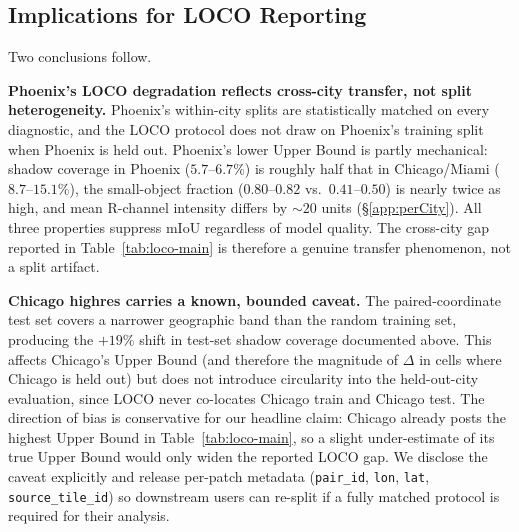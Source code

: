 \subsection{Implications for LOCO Reporting}
\label{app:splits-implications}

Two conclusions follow.

\textbf{Phoenix's LOCO degradation reflects cross-city transfer, not split heterogeneity.}
Phoenix's within-city splits are statistically matched on every diagnostic, and the LOCO protocol does not draw on Phoenix's training split when Phoenix is held out. Phoenix's lower Upper Bound is partly mechanical: shadow coverage in Phoenix ($5.7$--$6.7\%$) is roughly half that in Chicago/Miami ($8.7$--$15.1\%$), the small-object fraction ($0.80$--$0.82$ vs.\ $0.41$--$0.50$) is nearly twice as high, and mean R-channel intensity differs by $\sim 20$ units (\S\ref{app:perCity}). All three properties suppress mIoU regardless of model quality. The cross-city gap reported in Table~\ref{tab:loco-main} is therefore a genuine transfer phenomenon, not a split artifact.

\textbf{Chicago highres carries a known, bounded caveat.}
The paired-coordinate test set covers a narrower geographic band than the random training set, producing the $+19\%$ shift in test-set shadow coverage documented above. This affects Chicago's Upper Bound (and therefore the magnitude of $\Delta$ in cells where Chicago is held out) but does not introduce circularity into the held-out-city evaluation, since LOCO never co-locates Chicago train and Chicago test. The direction of bias is conservative for our headline claim: Chicago already posts the highest Upper Bound in Table~\ref{tab:loco-main}, so a slight under-estimate of its true Upper Bound would only widen the reported LOCO gap. We disclose the caveat explicitly and release per-patch metadata (\texttt{pair\_id}, \texttt{lon}, \texttt{lat}, \texttt{source\_tile\_id}) so downstream users can re-split if a fully matched protocol is required for their analysis.